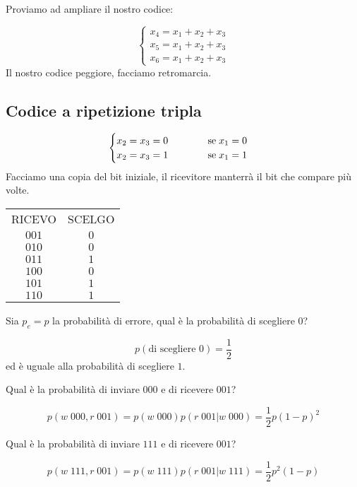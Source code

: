 \documentclass[12pt]{report}
\begin{document}
    \noindent
    Proviamo ad ampliare il nostro codice:

    $$\begin{cases} x_4 = x_1 + x_2 + x_3 \\
    x_5 = x_1 + x_2 + x_3 \\
    x_6 = x_1 + x_2 + x_3\end{cases}$$
    Il nostro codice peggiore, facciamo retromarcia.

    \subsection{Codice a ripetizione tripla}

    $$\begin{cases} x_2 = x_3 = 0 \hspace{40px} \text{se} \; x_1 = 0 \\
    x_2 = x_3 = 1 \hfill \text{se} \; x_1 = 1 \end{cases}$$
    Facciamo una copia del bit iniziale, il ricevitore manterrà il bit che compare più volte.

    \begin{center}
        \begin{tabular}{cc}
            RICEVO & SCELGO \\
            $001$& $0$  \\
            $010$& $0$  \\
            $011$& $1$  \\
            $100$& $0$  \\
            $101$& $1$  \\
            $110$& $1$
        \end{tabular}
    \end{center}

    \begin{es}
        Sia $p_e = p$ la probabilità di errore, qual è la probabilità di scegliere $0$?

        $$p(\text{di scegliere 0}) = \frac{1}{2}$$
        ed è uguale alla probabilità di scegliere $1$.
    \end{es}

    \begin{es}
        Qual è la probabilità di inviare $000$ e di ricevere $001$?

        $$p(w \; 000,r \; 001) = p(w\; 000) p(r \; 001 | w\; 000) = \frac{1}{2} p (1-p)^2$$
    \end{es}

    \begin{es}
        Qual è la probabilità di inviare $111$ e di ricevere $001$?

        $$p(w \; 111,r \; 001) = p(w\; 111) p(r \; 001 | w\; 111) = \frac{1}{2} p^2 (1-p)$$
    \end{es}
\end{document}
